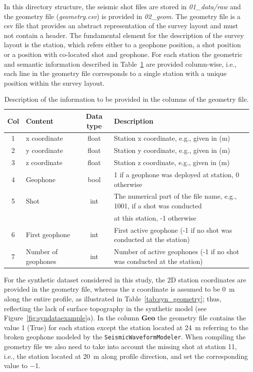 \documentclass[a4paper,fleqn]{cas-sc}
\begin{document}
In this directory structure, the seismic shot files are stored in \textit{01\_data/raw} and the geometry file (\textit{geometry.csv}) is provided in \textit{02\_geom}.
The geometry file is a csv file that provides an abstract representation of the survey layout and must not contain a header. The fundamental element for the description of the survey layout is the station, which refers either to a geophone position, a shot position or a position with co-located shot and geophone. For each station the geometric and semantic information described in Table~\ref{tab:geometry} are provided column-wise, i.e., each line in the geometry file corresponds to a single station with a unique position within the survey layout. 
\begin{table}[pos=h]
    \caption{Description of the information to be provided in the columns of the geometry file.}
    \centering
    \begin{tabular}{clcl}
        \toprule
        \textbf{Col} & \textbf{Content} & \textbf{Data type} & \textbf{Description} \\
        \midrule
        1 & x coordinate & float & Station x coordinate, e.g., given in (m) \\ 
        2 & y coordinate & float & Station y coordinate, e.g., given in (m) \\ 
        3 & z coordinate & float & Station z coordinate, e.g., given in (m) \\ 
        4 & Geophone & bool & 1 if a geophone was deployed at station, 0 otherwise \\ 
        5 & Shot & int & The numerical part of the file name, e.g., 1001, if a shot was conducted \\
          & & & at this station, -1 otherwise \\ 
        6 & First geophone & int & First active geophone (-1 if no shot was conducted at the station) \\ 
        7 & Number of geophones & int & Number of active geophones (-1 if no shot was conducted at the station) \\
        \bottomrule
    \end{tabular}
    \label{tab:geometry}
\end{table}
For the synthetic dataset considered in this study, the 2D station coordinates are provided in the geometry file, whereas the z coordinate is assumed to be \qty{0}{m} along the entire profile, as illustrated in Table~\ref{tab:syn_geometry}; thus, reflecting the lack of surface topography in the synthetic model (see Figure~\ref{fig:syndataexample}a). In the column \textbf{Geo} the geometry file contains the value 1 (True) for each station except the station located at \qty{24}{m} referring to the broken geophone modeled by the \texttt{SeismicWaveformModeler}. When compiling the geometry file we also need to take into account the missing shot at station 11, i.e., the station located at \qty{20}{m} along profile direction, and set the corresponding value to \num{-1}. 
\end{document}
